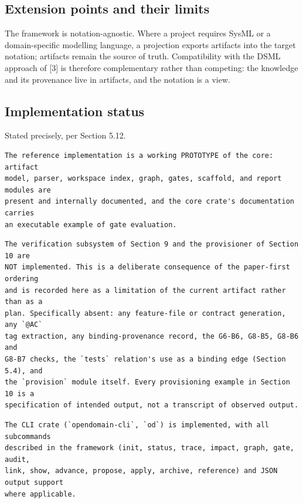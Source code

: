 \documentclass[11pt,a4paper]{article}
\begin{document}
\subsection{Extension points and their limits}

The framework is notation-agnostic. Where a project requires SysML or a domain-specific modelling language, a projection exports artifacts into the target notation; artifacts remain the source of truth. Compatibility with the DSML approach of [3] is therefore complementary rather than competing: the knowledge and its provenance live in artifacts, and the notation is a view.

\subsection{Implementation status}

Stated precisely, per Section 5.12.

\begin{Verbatim}[fontsize=\footnotesize,breaklines=true,breakanywhere=true,breakautoindent=false,samepage=false]
The reference implementation is a working PROTOTYPE of the core: artifact
model, parser, workspace index, graph, gates, scaffold, and report modules are
present and internally documented, and the core crate's documentation carries
an executable example of gate evaluation.
\end{Verbatim}

\begin{Verbatim}[fontsize=\footnotesize,breaklines=true,breakanywhere=true,breakautoindent=false,samepage=false]
The verification subsystem of Section 9 and the provisioner of Section 10 are
NOT implemented. This is a deliberate consequence of the paper-first ordering
and is recorded here as a limitation of the current artifact rather than as a
plan. Specifically absent: any feature-file or contract generation, any `@AC`
tag extraction, any binding-provenance record, the G6-B6, G8-B5, G8-B6 and
G8-B7 checks, the `tests` relation's use as a binding edge (Section 5.4), and
the `provision` module itself. Every provisioning example in Section 10 is a
specification of intended output, not a transcript of observed output.
\end{Verbatim}

\begin{Verbatim}[fontsize=\footnotesize,breaklines=true,breakanywhere=true,breakautoindent=false,samepage=false]
The CLI crate (`opendomain-cli`, `od`) is implemented, with all subcommands
described in the framework (init, status, trace, impact, graph, gate, audit,
link, show, advance, propose, apply, archive, reference) and JSON output support
where applicable.
\end{Verbatim}
\end{document}
